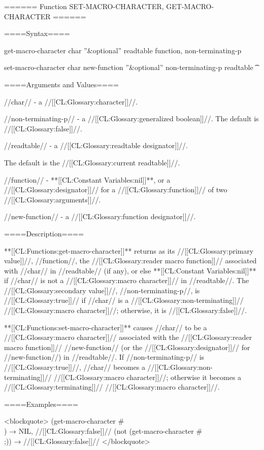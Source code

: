 ====== Function SET-MACRO-CHARACTER, GET-MACRO-CHARACTER ======

====Syntax====

\DefunWithValues get-macro-character {char ''&optional'' readtable} {function, non-terminating-p}

\DefunWithValues set-macro-character {char new-function ''&optional'' non-terminating-p readtable} {\t}

====Arguments and Values====

//char// - a //[[CL:Glossary:character]]//.

//non-terminating-p// - a //[[CL:Glossary:generalized boolean]]//. The default is //[[CL:Glossary:false]]//.

//readtable// - a //[[CL:Glossary:readtable designator]]//.

The default is the //[[CL:Glossary:current readtable]]//.

//function// - **[[CL:Constant Variables:nil]]**, or a //[[CL:Glossary:designator]]// for a //[[CL:Glossary:function]]// of two //[[CL:Glossary:arguments]]//.

//new-function// - a //[[CL:Glossary:function designator]]//.

====Description====

**[[CL:Functions:get-macro-character]]** returns as its //[[CL:Glossary:primary value]]//, //function//, the //[[CL:Glossary:reader macro function]]// associated with //char// in //readtable// (if any), or else **[[CL:Constant Variables:nil]]** if //char// is not a //[[CL:Glossary:macro character]]// in //readtable//. The //[[CL:Glossary:secondary value]]//, //non-terminating-p//, is //[[CL:Glossary:true]]// if //char// is a //[[CL:Glossary:non-terminating]]// //[[CL:Glossary:macro character]]//; otherwise, it is //[[CL:Glossary:false]]//.

**[[CL:Functions:set-macro-character]]** causes //char// to be a //[[CL:Glossary:macro character]]// associated with the //[[CL:Glossary:reader macro function]]// //new-function// (or the //[[CL:Glossary:designator]]// for //new-function//) in //readtable//. If //non-terminating-p// is //[[CL:Glossary:true]]//, //char// becomes a //[[CL:Glossary:non-terminating]]// //[[CL:Glossary:macro character]]//; otherwise it becomes a //[[CL:Glossary:terminating]]// //[[CL:Glossary:macro character]]//.

====Examples====

<blockquote> (get-macro-character #\\\lbr) → NIL, //[[CL:Glossary:false]]// (not (get-macro-character #\\;)) → //[[CL:Glossary:false]]// </blockquote>

